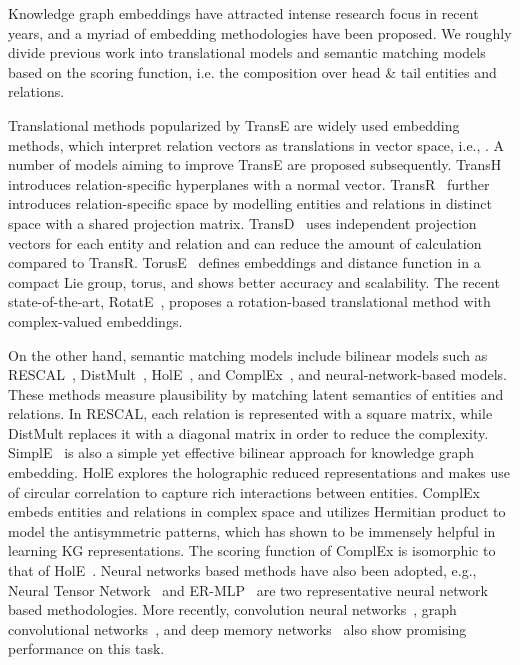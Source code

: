 \documentclass{article}
\begin{document}
Knowledge graph embeddings have attracted intense research focus in recent years, and a myriad of embedding methodologies have been proposed. We roughly divide previous work into translational models and semantic matching models based on the scoring function, i.e. the composition over head \& tail entities and relations.

Translational methods popularized by TransE \citep{bordes2013translating} are widely used embedding methods, which interpret relation vectors as translations in vector space, i.e., . A number of models aiming to improve TransE are proposed subsequently. TransH~\citep{wang2014knowledge} introduces relation-specific hyperplanes with a normal vector. TransR~\citep{lin2015learning} further introduces relation-specific space by modelling entities and relations in distinct space with a shared projection matrix. TransD~\citep{ji2015knowledge} uses independent projection vectors for each entity and relation and can reduce the amount of calculation compared to TransR. TorusE~\citep{ebisu2018toruse} defines embeddings and distance function in a compact Lie group, torus, and shows better accuracy and scalability. The recent state-of-the-art, RotatE~\citep{sun2019rotate}, proposes a rotation-based translational method with complex-valued embeddings.

On the other hand, semantic matching models include bilinear models such as RESCAL~\citep{nickel2011three}, DistMult~\citep{yang2014embedding}, HolE~\citep{nickel2016holographic}, and ComplEx~\citep{trouillon2016complex}, and neural-network-based models. These methods measure plausibility by matching latent semantics of entities and relations. In RESCAL, each relation is represented with a square matrix, while DistMult replaces it with a diagonal matrix in order to reduce the complexity. SimplE~\citep{kazemi2018simple} is also a simple yet effective bilinear approach for knowledge graph embedding. HolE explores the holographic reduced representations and makes use of circular correlation to capture rich interactions between entities. ComplEx embeds entities and relations in complex space and utilizes Hermitian product to model the antisymmetric patterns, which has shown to be immensely helpful in learning KG representations. The scoring function of ComplEx is isomorphic to that of HolE~\citep{trouillon2017complex}. Neural networks based methods have also been adopted, e.g., Neural Tensor Network~\citep{socher2013reasoning} and ER-MLP~\citep{dong2014knowledge} are two representative neural network based methodologies. More recently, convolution neural networks~\citep{dettmers2018convolutional}, graph convolutional networks~\citep{schlichtkrull2018modeling}, and deep memory networks~\citep{wang2018knowledge} also show promising performance on this task.
\end{document}
